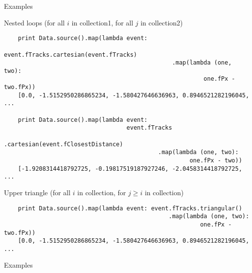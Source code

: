 \documentclass{beamer}
\begin{document}
\begin{frame}[fragile]{Examples}
\begin{block}{Nested loops (for all $i$ in collection1, for all $j$ in collection2)}
\vspace{-0.5\baselineskip}
{\scriptsize \begin{verbatim}
    print Data.source().map(lambda event:
                                   event.fTracks.cartesian(event.fTracks)
                                                .map(lambda (one, two):
                                                         one.fPx - two.fPx))
    [0.0, -1.5152950286865234, -1.580427646636963, 0.8946521282196045, ...

    print Data.source().map(lambda event:
                                   event.fTracks
                                            .cartesian(event.fClosestDistance)
                                            .map(lambda (one, two):
                                                     one.fPx - two))
    [-1.9208314418792725, -0.19817519187927246, -2.0458314418792725, ...
\end{verbatim}}
\end{block}

\begin{block}{Upper triangle (for all $i$ in collection, for $j \ge i$ in collection)}
\vspace{-0.5\baselineskip}
{\scriptsize \begin{verbatim}
    print Data.source().map(lambda event: event.fTracks.triangular()
                                               .map(lambda (one, two):
                                                        one.fPx - two.fPx))
    [0.0, -1.5152950286865234, -1.580427646636963, 0.8946521282196045, ...
\end{verbatim}}
\vspace{-0.5\baselineskip}
\end{block}
\end{frame}

\begin{frame}[fragile]{Examples}
\begin{block}{}




\end{block}
\end{frame}


\end{document}
